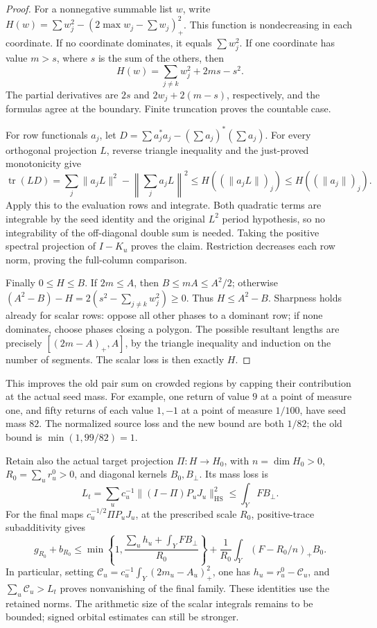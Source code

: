 \begin{proof}
For a nonnegative summable list \(w\), write
\(H(w)=\sum w_j^2-(2\max w_j-\sum w_j)_+^2\).
This function is nondecreasing in each coordinate. If no coordinate
dominates, it equals \(\sum w_j^2\). If one coordinate has value
\(m>s\), where \(s\) is the sum of the others, then
\[
 H(w)=\sum_{j\ne k}w_j^2+2ms-s^2.
\]
The partial derivatives are \(2s\) and
\(2w_j+2(m-s)\), respectively, and the formulas agree at the boundary.
Finite truncation proves the countable case.

For row functionals \(a_j\), let
\(D=\sum a_j^*a_j-(\sum a_j)^*(\sum a_j)\).
For every orthogonal projection \(L\), reverse triangle inequality
and the just-proved monotonicity give
\[
 \operatorname{tr}(LD)
 =\sum_j\|a_jL\|^2-\left\|\sum_j a_jL\right\|^2
 \le H((\|a_jL\|)_j)\le H((\|a_j\|)_j).
\]
Apply this to the evaluation rows and integrate. Both quadratic terms
are integrable by the seed identity and the original \(L^2\) period
hypothesis, so no integrability of the off-diagonal double sum is needed.
Taking the positive spectral projection of \(I-K_u\) proves the claim.
Restriction decreases each row norm, proving the full-column comparison.

Finally \(0\le H\le B\). If \(2m\le A\), then
\(B\le mA\le A^2/2\); otherwise
\((A^2-B)-H=2(s^2-\sum_{j\ne k}w_j^2)\ge0\).
Thus \(H\le A^2-B\). Sharpness holds already for scalar rows:
oppose all other phases to a dominant row; if none dominates, choose
phases closing a polygon. The possible resultant lengths are precisely
\([(2m-A)_+,A]\), by the triangle inequality and induction on the
number of segments. The scalar loss is then exactly \(H\).
\end{proof}

This improves the old pair sum on crowded regions by capping their
contribution at the actual seed mass. For example, one return of value
\(9\) at a point of measure one, and fifty returns of each value
\(1,-1\) at a point of measure \(1/100\), have seed
mass \(82\). The normalized source loss and the new bound are both
\(1/82\); the old bound is \(\min(1,99/82)=1\).

Retain also the actual target projection \(\Pi:H\to H_0\), with
\(n=\dim H_0>0\), \(R_0=\sum_u r_u^0>0\), and diagonal kernels
\(B_0,B_\perp\). Its mass loss is
\[
 L_t=\sum_uc_u^{-1}\|(I-\Pi)P_uJ_u\|_{\mathrm{HS}}^2
       \le\int_YFB_\perp.
\]
For the final maps \(c_u^{-1/2}\Pi P_uJ_u\), at the prescribed
scale \(R_0\), positive-trace subadditivity gives
\[
 g_{R_0}+b_{R_0}\le
 \min\left\{1,\frac{\sum_u h_u+\int_YFB_\perp}{R_0}\right\}
 +\frac1{R_0}\int_Y(F-R_0/n)_+B_0.
\]
In particular, setting
\(\mathcal C_u=c_u^{-1}\int_Y(2m_u-A_u)_+^2\), one has
\(h_u=r_u^0-\mathcal C_u\), and \(\sum_u\mathcal C_u>L_t\)
proves nonvanishing of the final family. These identities use the
retained norms. The arithmetic size of the scalar integrals remains to
be bounded; signed orbital estimates can still be stronger.

